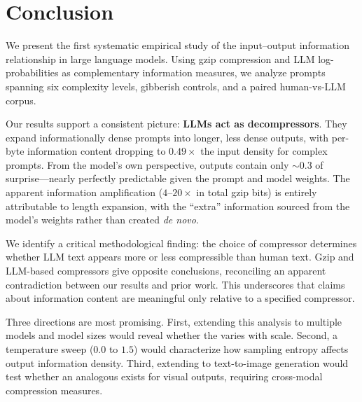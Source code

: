 \section{Conclusion}
\label{sec:conclusion}

We present the first systematic empirical study of the input--output information relationship in large language models. Using gzip compression and LLM log-probabilities as complementary information measures, we analyze prompts spanning six complexity levels, gibberish controls, and a paired human-vs-LLM corpus.

Our results support a consistent picture: \textbf{LLMs act as decompressors}. They expand informationally dense prompts into longer, less dense outputs, with per-byte information content dropping to $0.49\times$ the input density for complex prompts. From the model's own perspective, outputs contain only ${\sim}0.3$ \bpt of surprise---nearly perfectly predictable given the prompt and model weights. The apparent information amplification ($4$--$20\times$ in total gzip bits) is entirely attributable to length expansion, with the ``extra'' information sourced from the model's weights rather than created \emph{de novo}.

We identify a critical methodological finding: the choice of compressor determines whether LLM text appears more or less compressible than human text. Gzip and LLM-based compressors give opposite conclusions, reconciling an apparent contradiction between our results and prior work. This underscores that claims about information content are meaningful only relative to a specified compressor.

Three directions are most promising. First, extending this analysis to multiple models and model sizes would reveal whether the \densityratio varies with scale. Second, a temperature sweep ($0.0$ to $1.5$) would characterize how sampling entropy affects output information density. Third, extending to text-to-image generation would test whether an analogous \densityratio exists for visual outputs, requiring cross-modal compression measures.
